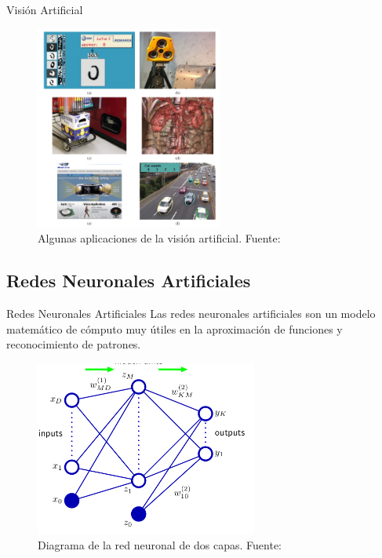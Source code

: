 \documentclass[10pt]{beamer}
\begin{document}
\begin{frame}{Visión Artificial}
    \begin{figure}[!h] 
        \centering
        \includegraphics[width=0.55\textwidth]{../img/cvision}
        \caption[Algunas aplicaciones de la visión artificial]{Algunas aplicaciones de la visión artificial. Fuente: \cite{Szeliski2011} }
    \end{figure}
\end{frame}

\subsection{Redes Neuronales Artificiales}
\begin{frame}{Redes Neuronales Artificiales}
    Las redes neuronales artificiales son un modelo matemático de cómputo muy útiles en la aproximación de funciones y reconocimiento de patrones.

    \begin{figure}[!h] 
        \centering
        \includegraphics[width=0.65\textwidth]{../img/reddoscapas}
        \caption[Diagrama de una red neuronal de dos capas]{Diagrama de la red neuronal de dos capas. Fuente: \cite{Bishop2006} }
        \label{fig:reddoscapas}
    \end{figure}

\end{frame}
\end{document}
